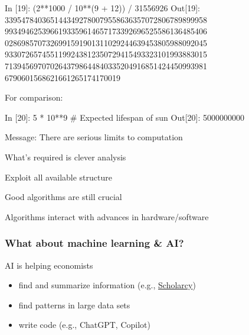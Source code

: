 \documentclass[
    xcolor={svgnames,dvipsnames},
    hyperref={colorlinks, citecolor=DeepPink4, linkcolor=DarkRed, urlcolor=DarkBlue}
    ]{beamer}  %
\newcommand{\1}{\mathbbm 1}
\begin{document}
\begin{frame}[fragile]


\begin{pythoncode}
In [19]: (2**1000 / 10**(9 + 12)) / 31556926
Out[19]:
3395478403651443492780079558636357072806789899958
9934946253966193359614657173392696525586136485406
0286985707326991591901311029244639453805988092045
9330726574551199243812350729415493323101993883015
7139456970702643798644840335204916851424450993981
6790601568621661265174170019
\end{pythoncode}

    For comparison:

\begin{pythoncode}
In [20]: 5 * 10**9 # Expected lifespan of sun
Out[20]: 5000000000
\end{pythoncode}


\end{frame}



\begin{frame}

    Message: There are serious limits to computation

    \vspace{1em}
    What's required is clever analysis

    \vspace{1em}
    Exploit all available structure

    \vspace{1em}
    Good algorithms are still crucial

    \vspace{1em}
    Algorithms interact with advances in hardware/software

\end{frame}



\begin{frame}
    \frametitle{What about machine learning \& AI?}

    AI is helping economists
    \vspace{1em}

    \begin{itemize}
        \item find and summarize information (e.g., \href{https://www.scholarcy.com/}{Scholarcy})
        \vspace{1em}
        \item find patterns in large data sets
        \vspace{1em}
        \item write code (e.g., ChatGPT, Copilot)
    \end{itemize}
    
\end{frame}
\end{document}
